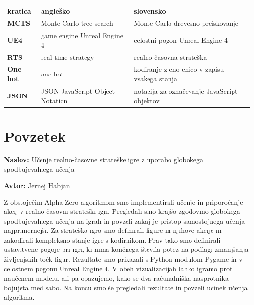\documentclass[a4paper, 12pt]{book}
\newcommand{\ttitle}{Učenje realno-časovne strateške igre z uporabo globokega spodbujevalnega učenja}
\newcommand{\tauthor}{Jernej Habjan}
\newcommand{\clearemptydoublepage}{\newpage{\pagestyle{empty}\cleardoublepage}}
\begin{document}

\noindent\begin{tabular}{p{}|p{}|p{}}    %
	{\bf kratica} & {\bf angleško} & {\bf slovensko} \\ \hline
	{\bf MCTS} & Monte Carlo tree search & Monte-Carlo drevesno preiskovanje \\
	{\bf UE4} & game engine Unreal Engine 4 & celostni pogon Unreal Engine 4 \\
	{\bf RTS} & real-time strategy & realno-časovna strateška \\
	{\bf One hot} & one hot & kodiranje z eno enico v zapisu vsakega stanja  \\
	{\bf JSON} & JSON JavaScript Object Notation & notacija za označevanje JavaScript objektov \\
	

\end{tabular}


\clearemptydoublepage

\chapter*{Povzetek}

\noindent\textbf{Naslov:} \ttitle
\bigskip

\noindent\textbf{Avtor:} \tauthor
\bigskip

\noindent 
Z obstoječim Alpha Zero algoritmom smo implementirali učenje in priporočanje akcij v realno-časovni strateški igri.
Pregledali smo krajšo zgodovino globokega spodbujevalnega učenja na igrah in povzeli zakaj je pristop samostojnega učenja najprimernejši.
Za strateško igro smo definirali figure in njihove akcije in zakodirali kompleksno stanje igre s kodirnikom.
Prav tako smo definirali ustavitvene pogoje pri igri, ki nima končnega števila potez na podlagi zmanjšanja življenjskih točk figur.
Rezultate smo prikazali s Python modulom Pygame in v celostnem pogonu Unreal Engine 4. 
V obeh vizualizacijah lahko igramo proti naučenem modelu, ali pa opazujemo, kako se dva računalniška nasprotnika bojujeta med sabo.
Na koncu smo še pregledali rezultate in povzeli učinek učenja algoritma.
\bigskip
\end{document}
